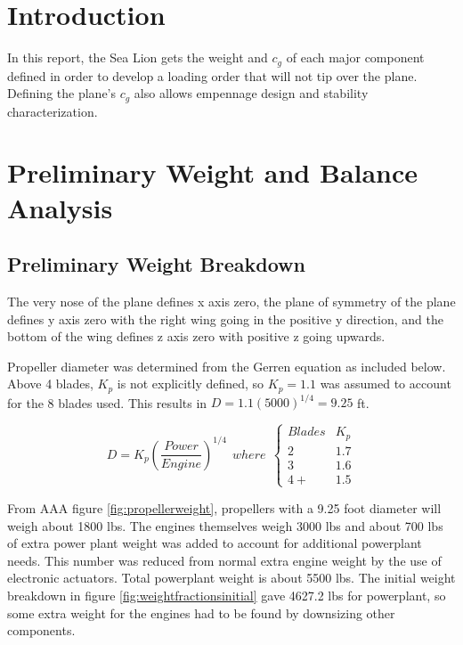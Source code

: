 \documentclass[conf]{new-aiaa}
\begin{document}
\newpage
{}

\section{Introduction}
In this report, the Sea Lion gets the weight and $c_g$ of each major component defined in order to develop a loading order that will not tip over the plane. Defining the plane's $c_g$ also allows empennage design and stability characterization. 

\section{Preliminary Weight and Balance Analysis}

\subsection{Preliminary Weight Breakdown}

The very nose of the plane defines x axis zero, the plane of symmetry of the plane defines y axis zero with the right wing going in the positive y direction, and the bottom of the wing defines z axis zero with positive z going upwards.

Propeller diameter was determined from the Gerren equation as included below\cite{pres18}. Above 4 blades, $K_p$ is not explicitly defined, so $K_p=1.1$ was assumed to account for the 8 blades used. This results in $D=1.1(5000)^{1/4}=9.25$ ft.

\[ D = K_p(\frac{Power}{Engine})^{1/4} \ \ where\ \ \begin{cases} 
      Blades & K_p \\
      2 & 1.7 \\
      3 &  1.6 \\
      4+ & 1.5 
   \end{cases}
\] 

From AAA figure \ref{fig:propellerweight}, propellers with a 9.25 foot diameter will weigh about 1800 lbs. The engines themselves weigh 3000 lbs and about 700 lbs of extra power plant weight was added to account for additional powerplant needs. This number was reduced from normal extra engine weight by the use of electronic actuators. Total powerplant weight is about 5500 lbs. The initial weight breakdown in figure \ref{fig:weightfractionsinitial} gave 4627.2 lbs for powerplant, so some extra weight for the engines had to be found by downsizing other components. 
\end{document}
